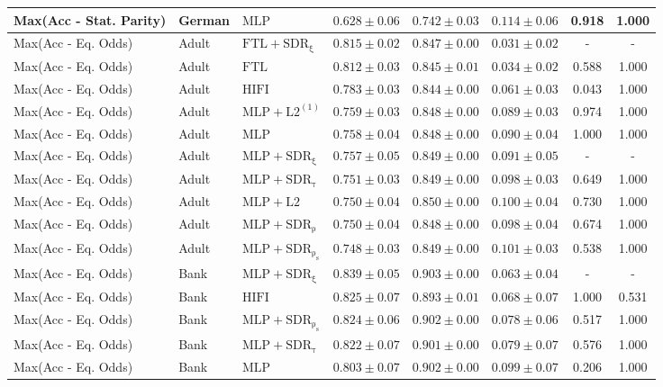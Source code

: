 \begin{table}[htbp]
\begin{tabular}{lllccccc}
Max(Acc - Stat. Parity) & German & $\mathrm{MLP}$ & $0.628 \pm0.06$ & $0.742 \pm0.03$ & $0.114 \pm0.06$ & 0.918 & 1.000 \\
\midrule
Max(Acc - Eq. Odds) & Adult & $\mathrm{FTL+SDR_{\xi}}$ & $0.815 \pm0.02$ & $0.847 \pm0.00$ & $0.031 \pm0.02$ & - & - \\
Max(Acc - Eq. Odds) & Adult & $\mathrm{FTL}$ & $0.812 \pm0.03$ & $0.845 \pm0.01$ & $0.034 \pm0.02$ & 0.588 & 1.000 \\
Max(Acc - Eq. Odds) & Adult & $\mathrm{HIFI}$ & $0.783 \pm0.03$ & $0.844 \pm0.00$ & $0.061 \pm0.03$ & 0.043 & 1.000 \\
Max(Acc - Eq. Odds) & Adult & $\mathrm{MLP+L2^{(1)}}$ & $0.759 \pm0.03$ & $0.848 \pm0.00$ & $0.089 \pm0.03$ & 0.974 & 1.000 \\
Max(Acc - Eq. Odds) & Adult & $\mathrm{MLP}$ & $0.758 \pm0.04$ & $0.848 \pm0.00$ & $0.090 \pm0.04$ & 1.000 & 1.000 \\
Max(Acc - Eq. Odds) & Adult & $\mathrm{MLP+SDR_{\xi}}$ & $0.757 \pm0.05$ & $0.849 \pm0.00$ & $0.091 \pm0.05$ & - & - \\
Max(Acc - Eq. Odds) & Adult & $\mathrm{MLP+SDR_{\tau}}$ & $0.751 \pm0.03$ & $0.849 \pm0.00$ & $0.098 \pm0.03$ & 0.649 & 1.000 \\
Max(Acc - Eq. Odds) & Adult & $\mathrm{MLP+L2}$ & $0.750 \pm0.04$ & $0.850 \pm0.00$ & $0.100 \pm0.04$ & 0.730 & 1.000 \\
Max(Acc - Eq. Odds) & Adult & $\mathrm{MLP+SDR_{\rho}}$ & $0.750 \pm0.04$ & $0.848 \pm0.00$ & $0.098 \pm0.04$ & 0.674 & 1.000 \\
Max(Acc - Eq. Odds) & Adult & $\mathrm{MLP+SDR_{\rho_s}}$ & $0.748 \pm0.03$ & $0.849 \pm0.00$ & $0.101 \pm0.03$ & 0.538 & 1.000 \\
Max(Acc - Eq. Odds) & Bank & $\mathrm{MLP+SDR_{\xi}}$ & $0.839 \pm0.05$ & $0.903 \pm0.00$ & $0.063 \pm0.04$ & - & - \\
Max(Acc - Eq. Odds) & Bank & $\mathrm{HIFI}$ & $0.825 \pm0.07$ & $0.893 \pm0.01$ & $0.068 \pm0.07$ & 1.000 & 0.531 \\
Max(Acc - Eq. Odds) & Bank & $\mathrm{MLP+SDR_{\rho_s}}$ & $0.824 \pm0.06$ & $0.902 \pm0.00$ & $0.078 \pm0.06$ & 0.517 & 1.000 \\
Max(Acc - Eq. Odds) & Bank & $\mathrm{MLP+SDR_{\tau}}$ & $0.822 \pm0.07$ & $0.901 \pm0.00$ & $0.079 \pm0.07$ & 0.576 & 1.000 \\
Max(Acc - Eq. Odds) & Bank & $\mathrm{MLP}$ & $0.803 \pm0.07$ & $0.902 \pm0.00$ & $0.099 \pm0.07$ & 0.206 & 1.000 \\

\end{tabular}
\end{table}
